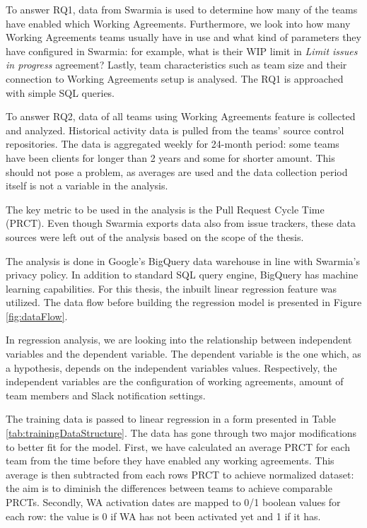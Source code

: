 To answer RQ1, data from Swarmia is used to determine how many of the teams have enabled which Working Agreements. Furthermore, we look into how many Working Agreements teams usually have in use and what kind of parameters they have configured in Swarmia: for example, what is their WIP limit in \textit{Limit issues in progress} agreement? Lastly, team characteristics such as team size and their connection to Working Agreements setup is analysed. The RQ1 is approached with simple SQL queries. 

To answer RQ2, data of all teams using Working Agreements feature is collected and analyzed. Historical activity data is pulled from the teams' source control repositories. The data is aggregated weekly for 24-month period: some teams have been clients for longer than 2 years and some for shorter amount. This should not pose a problem, as averages are used and the data collection period itself is not a variable in the analysis.

The key metric to be used in the analysis is the Pull Request Cycle Time (PRCT). Even though Swarmia exports data also from issue trackers, these data sources were left out of the analysis based on the scope of the thesis. 

The analysis is done in Google's BigQuery data warehouse in line with Swarmia's privacy policy. In addition to standard SQL query engine, BigQuery has machine learning capabilities. For this thesis, the inbuilt linear regression feature was utilized. The data flow before building the regression model is presented in Figure \ref{fig:dataFlow}. 

In regression analysis, we are looking into the relationship between independent variables and the dependent variable. The dependent variable is the one which, as a hypothesis, depends on the independent variables values. Respectively, the independent variables are the configuration of working agreements, amount of team members and Slack notification settings. 

The training data is passed to linear regression in a form presented in Table \ref{tab:trainingDataStructure}. The data has gone through two major modifications to better fit for the model. First, we have calculated an average PRCT for each team from the time before they have enabled any working agreements. This average is then subtracted from each rows PRCT to achieve normalized dataset: the aim is to diminish the differences between teams to achieve comparable PRCTs. Secondly, WA activation dates are mapped to 0/1 boolean values for each row: the value is 0 if WA has not been activated yet and 1 if it has.







